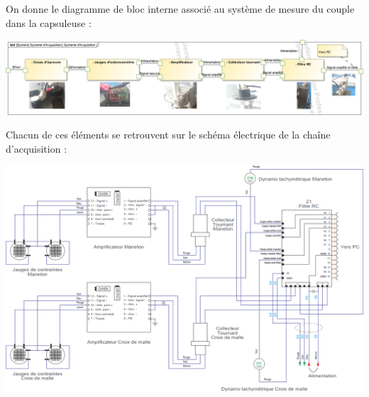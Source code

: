 \documentclass[10pt]{article}
\begin{document}
\vspace{.25cm}



On donne le diagramme de bloc interne associé au système de mesure du couple dans la capsuleuse :
\begin{center}
\includegraphics[width=\textwidth]{images/ibd}
\end{center}

Chacun de ces éléments se retrouvent sur le schéma électrique de la chaîne d'acquisition :

\begin{center}
\includegraphics[width=\textwidth]{images/SchemaElec}
\end{center}
\end{document}
